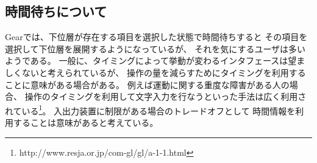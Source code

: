 \documentclass[twoside]{wiss}
\def\GEAR{\textsf{Gear}}
\begin{document}

% 

% 


\subsection{時間待ちについて}

{\GEAR}では、下位層が存在する項目を選択した状態で時間待ちすると
その項目を選択して下位層を展開するようになっているが、
それを気にするユーザは多いようである。
%
一般に、タイミングによって挙動が変わるインタフェースは望ましくないと考えられているが、
操作の量を減らすためにタイミングを利用することに意味がある場合がある。
例えば運動に関する重度な障害がある人の場合、
操作のタイミングを利用して文字入力を行なうといった手法は広く利用されている\footnote{
  \textsf{http://www.resja.or.jp/com-gl/gl/a-1-1.html}
}。
入出力装置に制限がある場合のトレードオフとして
時間情報を利用することは意味があると考えている。

\end{document}
